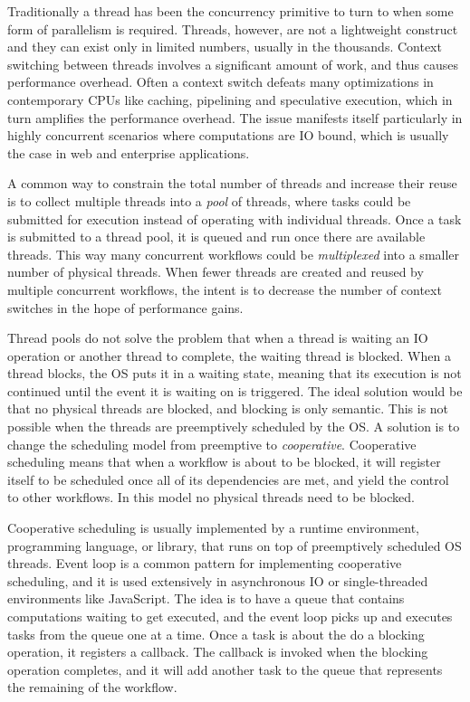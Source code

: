 Traditionally a thread has been the concurrency primitive to turn to when some form of parallelism is required. Threads, however, are not a lightweight construct and they can exist only in limited numbers, usually in the thousands. Context switching between threads involves a significant amount of work, and thus causes performance overhead. Often a context switch defeats many optimizations in contemporary CPUs like caching, pipelining and speculative execution, which in turn amplifies the performance overhead. The issue manifests itself particularly in highly concurrent scenarios where computations are IO bound, which is usually the case in web and enterprise applications.

A common way to constrain the total number of threads and increase their reuse is to collect multiple threads into a \emph{pool} of threads, where tasks could be submitted for execution instead of operating with individual threads. Once a task is submitted to a thread pool, it is queued and run once there are available threads. This way many concurrent workflows could be \emph{multiplexed} into a smaller number of physical threads. When fewer threads are created and reused by multiple concurrent workflows, the intent is to decrease the number of context switches in the hope of performance gains.

Thread pools do not solve the problem that when a thread is waiting an IO operation or another thread to complete, the waiting thread is blocked. When a thread blocks, the OS puts it in a waiting state, meaning that its execution is not continued until the event it is waiting on is triggered. The ideal solution would be that no physical threads are blocked, and blocking is only semantic. This is not possible when the threads are preemptively scheduled by the OS. A solution is to change the scheduling model from preemptive to \emph{cooperative}. Cooperative scheduling means that when a workflow is about to be blocked, it will register itself to be scheduled once all of its dependencies are met, and yield the control to other workflows. In this model no physical threads need to be blocked.

Cooperative scheduling is usually implemented by a runtime environment, programming language, or library, that runs on top of preemptively scheduled OS threads. Event loop is a common pattern for implementing cooperative scheduling, and it is used extensively in asynchronous IO or single-threaded environments like JavaScript. The idea is to have a queue that contains computations waiting to get executed, and the event loop picks up and executes tasks from the queue one at a time. Once a task is about the do a blocking operation, it registers a callback. The callback is invoked when the blocking operation completes, and it will add another task to the queue that represents the remaining of the workflow.

